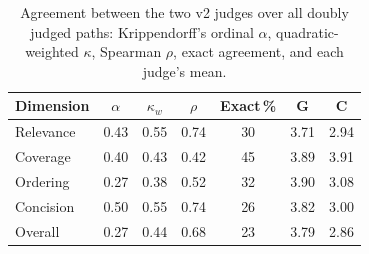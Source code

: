 \begin{table}[t]
\centering
\caption{Agreement between the two v2 judges over all doubly judged paths: Krippendorff's ordinal $\alpha$, quadratic-weighted $\kappa$, Spearman $\rho$, exact agreement, and each judge's mean.}
\label{tab:agree}
\footnotesize
\begin{tabular}{lcccccc}
\toprule
Dimension & $\alpha$ & $\kappa_w$ & $\rho$ & Exact\,\% & G & C \\
\midrule
Relevance & 0.43 & 0.55 & 0.74 & 30 & 3.71 & 2.94 \\
Coverage & 0.40 & 0.43 & 0.42 & 45 & 3.89 & 3.91 \\
Ordering & 0.27 & 0.38 & 0.52 & 32 & 3.90 & 3.08 \\
Concision & 0.50 & 0.55 & 0.74 & 26 & 3.82 & 3.00 \\
Overall & 0.27 & 0.44 & 0.68 & 23 & 3.79 & 2.86 \\
\bottomrule
\end{tabular}
\end{table}
